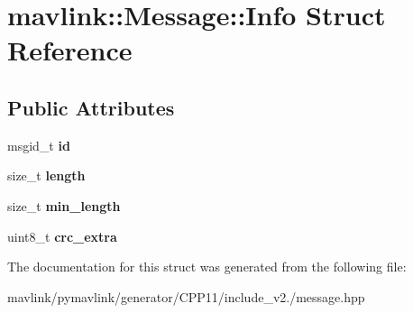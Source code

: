 \hypertarget{structmavlink_1_1Message_1_1Info}{}\section{mavlink\+:\+:Message\+:\+:Info Struct Reference}
\label{structmavlink_1_1Message_1_1Info}
\subsection*{Public Attributes}
\begin{DoxyCompactItemize}
\item 
\mbox{\label{structmavlink_1_1Message_1_1Info_ae5984fd30d3e9ec4412386f88cfbe8be}} 
msgid\+\_\+t {\bfseries id}
\item 
\mbox{\label{structmavlink_1_1Message_1_1Info_ab304bd0b3dbc5ddedb4e5d622c68f21e}} 
size\+\_\+t {\bfseries length}
\item 
\mbox{\label{structmavlink_1_1Message_1_1Info_aecb3d686fd15622b3e5a57ce4126dd36}} 
size\+\_\+t {\bfseries min\+\_\+length}
\item 
\mbox{\label{structmavlink_1_1Message_1_1Info_aa07bcd5fa25f60d1f86c6b71677371dd}} 
uint8\+\_\+t {\bfseries crc\+\_\+extra}
\end{DoxyCompactItemize}


The documentation for this struct was generated from the following file\+:\begin{DoxyCompactItemize}
\item 
mavlink/pymavlink/generator/\+C\+P\+P11/include\+\_\+v2./message.\+hpp\end{DoxyCompactItemize}
